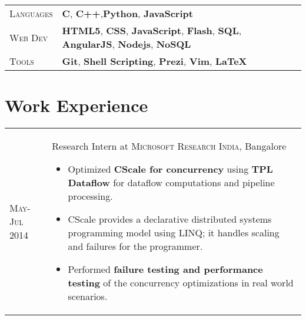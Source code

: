 \documentclass[a4paper,10pt]{article} %
\begin{document}
\begin{tabular}{>{\raggedleft}p{2.2cm}p{14cm}}

    \textsc{Languages} %
            & \textbf{C}, \textbf{C++},\textbf{Python}, \textbf{JavaScript} \\
    \textsc{Web Dev} %
            & \textbf{HTML5}, \textbf{CSS}, \textbf{JavaScript}, \textbf{Flash}, \textbf{SQL},
              \textbf{AngularJS}, \textbf{Nodejs}, \textbf{NoSQL}\\
    \textsc{Tools} %
            & \textbf{Git}, \textbf{Shell Scripting}, \textbf{Prezi}, \textbf{Vim}, \textbf{LaTeX}\\

\end{tabular}


\section{Work Experience}

\begin{tabular}{>{\raggedleft}p{2.2cm}|p{14cm}}
    \textsc{May-Jul 2014} & Research Intern at \textsc{Microsoft Research India}, Bangalore
                            \footnotesize{
                                \begin{itemize}[leftmargin=*]
                                    \item Optimized \textbf{CScale for concurrency} using \textbf{TPL Dataflow}
                                        for dataflow computations and pipeline processing.
                                    \item CScale provides a declarative distributed systems programming
                                        model using LINQ; it handles scaling and failures for the programmer.
                                    \item Performed \textbf{failure testing and performance testing}
                                        of the concurrency optimizations in real world scenarios.
                                \end{itemize}
                            }\\
\end{tabular}
\end{document}
